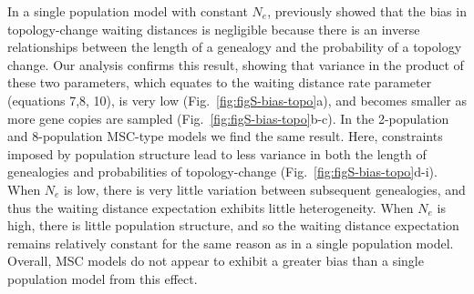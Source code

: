 \documentclass[11pt]{article}
\begin{document}
In a single population model with constant $N_e$, \citet{deng_distribution_2021}
previously showed that the bias in topology-change waiting distances is negligible
because there is an inverse relationships between the length of a genealogy
and the probability of a topology change. Our analysis confirms this result,
showing that variance in the product of these two parameters, 
which equates to the waiting distance rate parameter (equations 7,8, 10), 
is very low (Fig.~\ref{fig:figS-bias-topo}a), and becomes smaller as more 
gene copies are sampled (Fig.~\ref{fig:figS-bias-topo}b-c). In the 2-population
and 8-population MSC-type models we find the same result. Here, constraints 
imposed by population structure lead to less variance in both the 
length of genealogies and probabilities of topology-change
(Fig.~\ref{fig:figS-bias-topo}d-i). When $N_e$ is low, there is very 
little variation between subsequent genealogies, and thus the waiting 
distance expectation exhibits little heterogeneity. When $N_e$ is high,
there is little population structure, and so the waiting distance 
expectation remains relatively constant for the same reason as in a 
single population model. Overall, MSC models do not appear to exhibit a greater
bias than a single population model from this effect.
\end{document}
